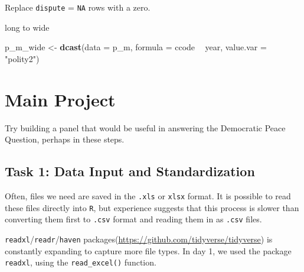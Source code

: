 \documentclass[]{book}
\newenvironment{Shaded}{\begin{snugshade}}{\end{snugshade}}
\newcommand{\DataTypeTok}[1]{\textcolor[rgb]{0.13,0.29,0.53}{#1}}
\newcommand{\DecValTok}[1]{\textcolor[rgb]{0.00,0.00,0.81}{#1}}
\newcommand{\KeywordTok}[1]{\textcolor[rgb]{0.13,0.29,0.53}{\textbf{#1}}}
\newcommand{\NormalTok}[1]{#1}
\newcommand{\OperatorTok}[1]{\textcolor[rgb]{0.81,0.36,0.00}{\textbf{#1}}}
\newcommand{\StringTok}[1]{\textcolor[rgb]{0.31,0.60,0.02}{#1}}
\theoremstyle{definition}
\theoremstyle{definition}
\theoremstyle{definition}
\theoremstyle{remark}
\begin{document}
\begin{Shaded}
\begin{Highlighting}[]
\begin{Shaded}
\begin{Highlighting}[]
\begin{Shaded}
\begin{Highlighting}[]
Replace \texttt{dispute} = \texttt{NA} rows with a zero.

\begin{Shaded}
\end{Shaded}

long to wide

\begin{Shaded}
\begin{Highlighting}[]
\NormalTok{p_m_wide <-}\StringTok{ }\KeywordTok{dcast}\NormalTok{(}\DataTypeTok{data =}\NormalTok{ p_m,}
                  \DataTypeTok{formula =}\NormalTok{ ccode }\OperatorTok{~}\StringTok{ }\NormalTok{year,}
                  \DataTypeTok{value.var =} \StringTok{"polity2"}\NormalTok{)}
\end{Highlighting}
\end{Shaded}

\hypertarget{main-project}{%
\section{Main Project}\label{main-project}}

Try building a panel that would be useful in answering the Democratic Peace Question, perhaps in these steps.

\hypertarget{task-1-data-input-and-standardization}{%
\subsection*{Task 1: Data Input and Standardization}\label{task-1-data-input-and-standardization}}

Often, files we need are saved in the \texttt{.xls} or \texttt{xlsx} format. It is possible to read these files directly into \texttt{R}, but experience suggests that this process is slower than converting them first to \texttt{.csv} format and reading them in as \texttt{.csv} files.

\texttt{readxl}/\texttt{readr}/\texttt{haven} packages(\url{https://github.com/tidyverse/tidyverse}) is constantly expanding to capture more file types. In day 1, we used the package \texttt{readxl}, using the \texttt{read\_excel()} function.

\hypertarget{task-2-data-merging}{%
}
\end{Highlighting}
\end{Shaded}
\end{Highlighting}
\end{Shaded}
\end{Highlighting}
\end{Shaded}
\end{document}
